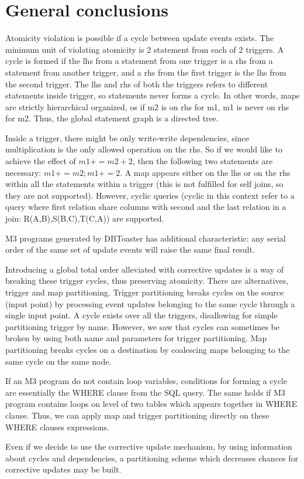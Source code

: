 \documentclass{sig-semester}
\begin{document}
\section{General conclusions}
\vspace{2mm}
Atomicity violation is possible if a cycle between update events exists. The minimum unit of violating atomicity is 2 statement from each of 2 triggers. A cycle is formed if the lhs from a statement from one trigger is a rhs from a statement from another trigger, and a rhs from the first trigger is the lhs from the second trigger. The lhs and rhs of both the triggers refers to different statements inside trigger, so statements never forms a cycle. In other words, maps are strictly hierarchical organized, os if m2 is on rhs for m1, m1 is never on rhs for m2. Thus, the global statement graph is a directed tree.

Inside a trigger, there might be only write-write dependencies, since multiplication is the only allowed operation on the rhs. So if we would like to achieve the effect of $m1+=m2+2$, then the following two statements are necessary: $m1+=m2; m1+=2$. A map appears either on the lhs or on the rhs within all the statements within a trigger (this is not fulfilled for self joins, so they are not supported). However, cyclic queries (cyclic in this context refer to a query where first relation share columns with second and the last relation in a join: R(A,B),S(B,C),T(C,A)) are supported.

M3 programs generated by DBToaster has additional characteristic: any serial order of the same set of update events will raise the same final result.

Introducing a global total order alleviated with corrective updates is a way of breaking these trigger cycles, thus preserving atomicity. There are alternatives, trigger and map partitioning. Trigger partitioning breaks cycles on the source (input point) by processing event updates belonging to the same cycle through a single input point. A cycle exists over all the triggers, disallowing for simple partitioning trigger by name. However, we saw that cycles can sometimes be broken by using both name and parameters for trigger partitioning. Map partitioning breaks cycles on a destination by coalescing maps belonging to the same cycle on the same node.

If an M3 program do not contain loop variables, conditions for forming a cycle are essentially the WHERE clause from the SQL query. The same holds if M3 program contains loops on level of two tables which appears together in WHERE clause. Thus, we can apply map and trigger partitioning directly on these WHERE clauses expressions.

Even if we decide to use the corrective update mechanism, by using information about cycles and dependencies, a partitioning scheme which decreases chances for corrective updates may be built.

%
%

\newpage
\end{document}
